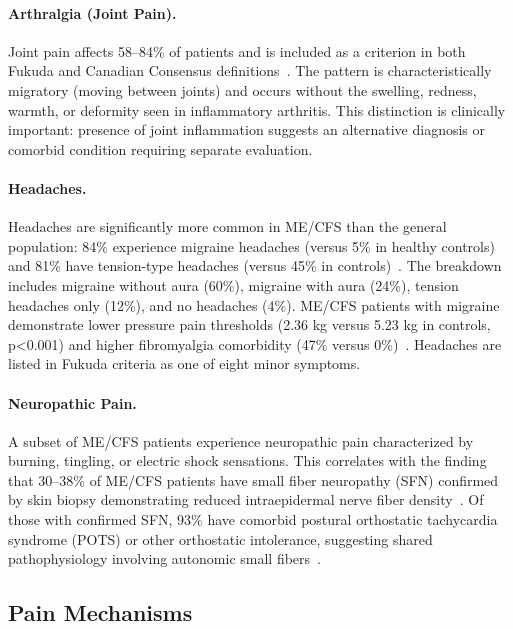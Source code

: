 \paragraph{Arthralgia (Joint Pain).}
Joint pain affects 58--84\% of patients and is included as a criterion in both Fukuda and Canadian Consensus definitions~\cite{Fukuda1994,Carruthers2003}. The pattern is characteristically migratory (moving between joints) and occurs without the swelling, redness, warmth, or deformity seen in inflammatory arthritis. This distinction is clinically important: presence of joint inflammation suggests an alternative diagnosis or comorbid condition requiring separate evaluation.

\paragraph{Headaches.}
Headaches are significantly more common in ME/CFS than the general population: 84\% experience migraine headaches (versus 5\% in healthy controls) and 81\% have tension-type headaches (versus 45\% in controls)~\cite{Ravindran2011headache}. The breakdown includes migraine without aura (60\%), migraine with aura (24\%), tension headaches only (12\%), and no headaches (4\%). ME/CFS patients with migraine demonstrate lower pressure pain thresholds (2.36 kg versus 5.23 kg in controls, p<0.001) and higher fibromyalgia comorbidity (47\% versus 0\%)~\cite{Ravindran2011headache}. Headaches are listed in Fukuda criteria as one of eight minor symptoms.

\paragraph{Neuropathic Pain.}
A subset of ME/CFS patients experience neuropathic pain characterized by burning, tingling, or electric shock sensations. This correlates with the finding that 30--38\% of ME/CFS patients have small fiber neuropathy (SFN) confirmed by skin biopsy demonstrating reduced intraepidermal nerve fiber density~\cite{Oaklander2022SFN}. Of those with confirmed SFN, 93\% have comorbid postural orthostatic tachycardia syndrome (POTS) or other orthostatic intolerance, suggesting shared pathophysiology involving autonomic small fibers~\cite{Devigili2023SFN}.

\subsection{Pain Mechanisms}
\label{subsec:pain-mechanisms}

